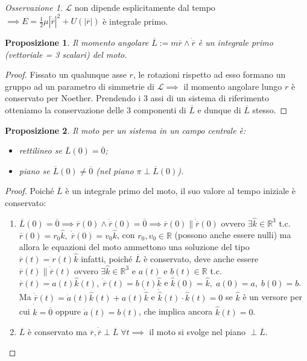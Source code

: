 \documentclass{book}
\theoremstyle{plain}
\theoremstyle{plain}
\theoremstyle{plain}
\theoremstyle{plain}
\theoremstyle{plain}
\newtheorem{prop}{Proposizione}[chapter]
\theoremstyle{definition}
\theoremstyle{remark}
\newtheorem*{oss}{Osservazione}
\theoremstyle{definition}
\begin{document}
\begin{oss}
    $\mathcal{L}$ non dipende esplicitamente dal tempo $\implies E=\frac{1}{2}\mu|\dot{\overline{r}}|^2 + U(|\overline{r}|)$ è integrale primo.
\end{oss}

\begin{prop}
     Il momento angolare $\overline{L}:=m\overline{r}\wedge\Dot{\overline{r}}$ è un integrale primo (vettoriale = 3 scalari) del moto.
\end{prop}

\begin{proof}
    Fissato un qualunque asse $r$, le rotazioni rispetto ad esso formano un gruppo ad un parametro di simmetrie di $\mathcal{L}\implies$ il momento angolare lungo $r$ è conservato per Noether. Prendendo i 3 assi di un sistema di riferimento otteniamo la conservazione delle 3 componenti di $\overline{L}$ e dunque di $\overline{L}$ stesso.
\end{proof}

\begin{prop}
    Il moto per un sistema in un campo centrale è:
    \begin{itemize}
        \item rettilineo se $\overline{L}(0)=\overline{0}$;
        \item piano se $\overline{L}(0)\neq \overline{0}$ (nel piano $\pi \perp \overline{L}(0)$).
    \end{itemize}
\end{prop}

\begin{proof}
    Poiché $\overline{L}$ è un integrale primo del moto, il suo valore al tempo iniziale è conservato:
    \begin{enumerate}
        \item $\overline{L}(0)=\overline{0}\implies\overline{r}(0)\wedge\Dot{\overline{r}}(0)=\overline{0}\implies\overline{r}(0)\parallel\Dot{\overline{r}}(0)$ ovvero $\exists \hat{k}\in\mathbb{R}^3$ t.c. $\overline{r}(0)=r_0\hat{k}, \;\Dot{\overline{r}}(0)=v_0\hat{k}$, con $r_0, v_0 \in \mathbb{R}$ (possono anche essere nulli) ma allora le equazioni del moto ammettono una soluzione del tipo $\overline{r}(t)=r(t)\hat{k}$ infatti, poiché $\overline{L}$ è conservato, deve anche essere $\overline{r}(t)\parallel\Dot{\overline{r}}(t)$ ovvero $\exists \hat{k}\in\mathbb{R}^3$ e $a(t)$ e $b(t) \in \mathbb{R}$ t.c. $\overline{r}(t)=a(t)\hat{k}(t),\; \Dot{\overline{r}}(t)=b(t)\hat{k}$ e $\hat{k}(0)=\hat{k},\; a(0)=a, \;b(0)=b$. Ma $\Dot{\overline{r}}(t)=\Dot{a}(t)\hat{k}(t)+a(t)\Dot{\hat{k}}$ e $\Dot{\hat{k}}(t)\cdot\hat{k}(t)=0$ se $\hat{k}$ è un versore per cui $\Dot{\hat{k}}=\overline{0}$ oppure $\Dot{a}(t)=b(t)$, che implica ancora $\hat{k}(t)=0$.
        \item $\overline{L}$ è conservato ma $\overline{r}, \Dot{\overline{r}}\perp\overline{L}\;\forall t\implies$ il moto si svolge nel piano $\perp\overline{L}$.
    \end{enumerate}
\end{proof}
\end{document}
